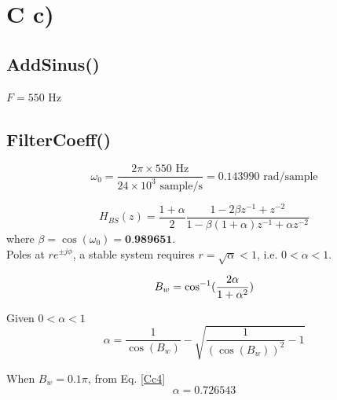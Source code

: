 \documentclass{article}
\newenvironment{homeworkProblem}[1]{
	\section*{#1}
	}{
}
\newenvironment{homeworkSection}[1]{
	\subsection*{#1}
	}{
}
\newcommand{\problemAnswer}[1]{
	\noindent\framebox[\columnwidth][c]{
		\begin{minipage}{0.98\columnwidth}
			#1
		\end{minipage}
	}
}
\begin{document}

\begin{homeworkProblem}{C c)}


\begin{homeworkSection}{AddSinus()}

$F = 550$ Hz\\

\problemAnswer{

}

\end{homeworkSection}


\begin{homeworkSection}{FilterCoeff()}

\begin{equation}\label{Cc1}
\omega_0 = \frac{2\pi \times 550 \text{ Hz}}{24 \times 10^3 \text{ sample/s}} = 0.143990 \text{ rad/sample}
\end{equation}

\begin{equation}\label{Cc2}
H_{BS}(z) = \frac{1+\alpha}{2} \frac{1-2\beta z^{-1} + z^{-2}}{1 - \beta (1+\alpha) z^{-1} + \alpha z^{-2}}
\end{equation}
where $\beta = \cos(\omega_0) = \textbf{0.989651}$.\\

Poles at $r e^{\pm j\phi}$, a stable system requires $r=\sqrt{\alpha}<1$, i.e. $0<\alpha<1$.

\begin{equation}\label{Cc3}
B_w = \cos^{-1}(\frac{2\alpha}{1+\alpha^2})\\
\end{equation}

Given $0<\alpha<1$
\begin{equation}\label{Cc4}
\alpha = \frac{1}{\cos(B_w)} - \sqrt{\frac{1}{(\cos(B_w))^2}-1}
\end{equation}

\problemAnswer{

}

When $B_w = 0.1\pi$, from Eq. \ref{Cc4}
\begin{equation}
\alpha = 0.726543
\end{equation}


\end{homeworkSection}
\end{homeworkProblem}
\end{document}
